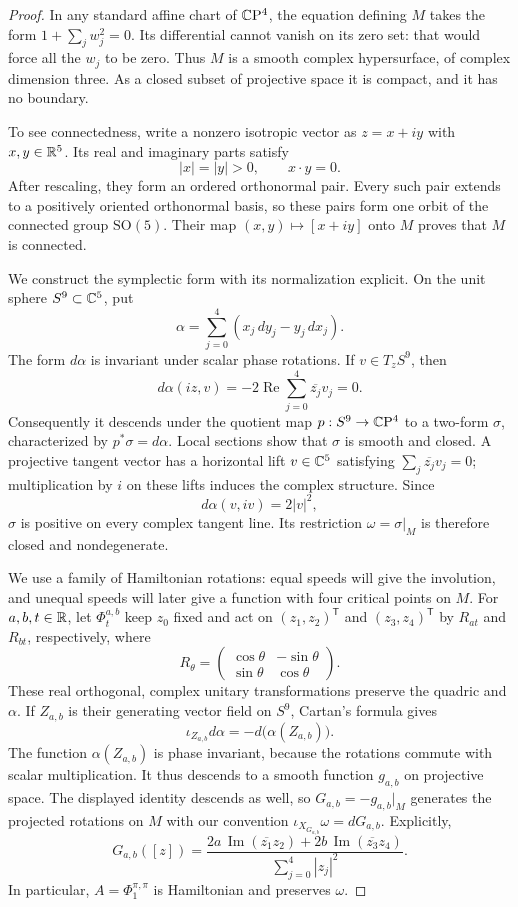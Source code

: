 \begin{proof}
In any standard affine chart of $\mathbb C\mathrm P^4$, the equation defining $M$
takes the form $1+\sum_j w_j^2=0$.  Its differential cannot vanish on
its zero set: that would force all the $w_j$ to be zero.  Thus $M$ is
a smooth complex hypersurface, of complex dimension three.  As a
closed subset of projective space it is compact, and it has no
boundary.

To see connectedness, write a nonzero isotropic vector as $z=x+iy$
with $x,y\in\mathbb R^5$.  Its real and imaginary parts satisfy
\[
 |x|=|y|>0,\qquad x\cdot y=0.
\]
After rescaling, they form an ordered orthonormal pair.  Every such
pair extends to a positively oriented orthonormal basis, so these
pairs form one orbit of the connected group $\mathrm{SO}(5)$.  Their
map $(x,y)\mapsto[x+iy]$ onto $M$ proves that $M$ is connected.

We construct the symplectic form with its normalization explicit.
On the unit sphere $S^9\subset\mathbb C^5$, put
\[
 \alpha=\sum_{j=0}^4(x_j\,dy_j-y_j\,dx_j).
\]
The form $d\alpha$ is invariant under scalar phase rotations.  If
$v\in T_zS^9$, then
\[
 d\alpha(iz,v)
   =-2\operatorname{Re}\sum_{j=0}^4\overline{z_j}v_j=0.
\]
Consequently it descends under the quotient map
$p:S^9\to\mathbb C\mathrm P^4$ to a two-form $\sigma$, characterized by
$p^*\sigma=d\alpha$.  Local sections show that $\sigma$ is smooth
and closed.  A projective tangent vector has a horizontal lift
$v\in\mathbb C^5$ satisfying $\sum_j\overline{z_j}v_j=0$; multiplication by
$i$ on these lifts induces the complex structure.  Since
\[
 d\alpha(v,iv)=2|v|^2,
\]
$\sigma$ is positive on every complex tangent line.  Its restriction
$\omega=\sigma|_M$ is therefore closed and nondegenerate.

We use a family of Hamiltonian rotations: equal speeds will give the
involution, and unequal speeds will later give a function with four
critical points on $M$. For $a,b,t\in\mathbb R$, let $\Phi_t^{a,b}$ keep $z_0$
fixed and act on $(z_1,z_2)^{\mathsf T}$ and $(z_3,z_4)^{\mathsf T}$ by
$R_{at}$ and $R_{bt}$, respectively, where
\[
 R_\theta=
 \begin{pmatrix}
  \cos\theta&-\sin\theta\\
  \sin\theta&\cos\theta
 \end{pmatrix}.
\]
These real orthogonal, complex unitary transformations preserve the
quadric and $\alpha$. If $Z_{a,b}$ is their generating vector field
on $S^9$, Cartan's formula
gives
\[
 \iota_{Z_{a,b}}d\alpha=-d\bigl(\alpha(Z_{a,b})\bigr).
\]
The function $\alpha(Z_{a,b})$ is phase invariant, because the rotations
commute with scalar multiplication.  It thus descends to a smooth
function $g_{a,b}$ on projective space. The displayed identity descends
as well, so $G_{a,b}=-g_{a,b}|_M$ generates the projected rotations on
$M$ with our convention $\iota_{X_{G_{a,b}}}\omega=dG_{a,b}$.
Explicitly,
\begin{equation}\label{eq:rotation-hamiltonian}
 G_{a,b}([z])=
 \frac{2a\,\operatorname{Im}(\overline{z_1}z_2)
       +2b\,\operatorname{Im}(\overline{z_3}z_4)}
      {\sum_{j=0}^4|z_j|^2}.
\end{equation}
In particular, $A=\Phi_1^{\pi,\pi}$ is Hamiltonian and preserves $\omega$.


\end{proof}
